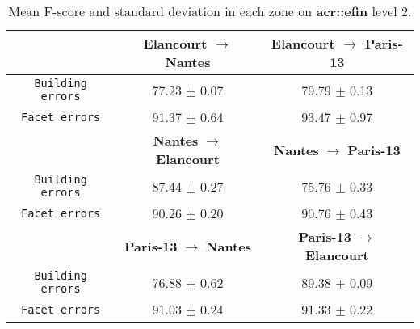         \begin{table}[htbp]
            \footnotesize
            \centering
            \begin{tabular}{c c c}
                \toprule
                & \textbf{Elancourt} \(\rightarrow\) \textbf{Nantes} & \textbf{Elancourt} \(\rightarrow\) \textbf{Paris-13} \\
                \midrule
                \texttt{Building errors} & 77.23 $\pm$ 0.07 & 79.79 $\pm$ 0.13 \\
                \midrule
                \texttt{Facet errors} & 91.37 $\pm$ 0.64 & 93.47 $\pm$ 0.97 \\
                \bottomrule
                \toprule
                & \textbf{Nantes} \(\rightarrow\) \textbf{Elancourt} & \textbf{Nantes} \(\rightarrow\) \textbf{Paris-13} \\
                \texttt{Building errors} & 87.44 $\pm$ 0.27 & 75.76 $\pm$ 0.33 \\
                \midrule
                \texttt{Facet errors} & 90.26 $\pm$ 0.20 & 90.76 $\pm$ 0.43 \\
                \bottomrule
                \toprule
                & \textbf{Paris-13} \(\rightarrow\) \textbf{Nantes} & \textbf{Paris-13} \(\rightarrow\) \textbf{Elancourt} \\
                \texttt{Building errors} & 76.88 $\pm$ 0.62 & 89.38 $\pm$ 0.09 \\
                \midrule
                \texttt{Facet errors} & 91.03 $\pm$ 0.24 & 91.33 $\pm$ 0.22 \\
                \bottomrule
            \end{tabular}
            \caption{
                \label{tab::f_score_transferability_f2}
                Mean F-score and standard deviation in each zone on \textbf{\gls{acr::efin}} level 2.
            }
        \end{table}
        
